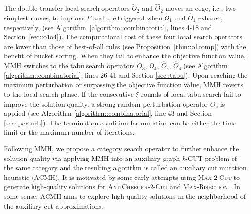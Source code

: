 \documentclass[12pt, a4paper]{article}%
\numberwithin{equation}{section}
\theoremstyle{plain}
\newcommand{\blue}{\textcolor{blue}}
\begin{document}

The double-transfer local search operators $\widetilde{O}_2$ and $\widehat{O}_2$ moves an edge, i.e., two simplest moves, to improve $F$ and are triggered when $\widetilde{O}_1$ and $\widehat{O}_1$ exhaust, respectively, (see Algorithm~\ref{algorithm::combinatorial}, lines 4-18 and Section~\ref{sec::o1o4}). The computational cost of these four local search operators are lower than those of best-of-all rules (see Proposition~\ref{thm::o1comp}) with the benefit of bucket sorting.  When they fail to enhance the objective function value, 
MMH switches to the tabu search operators $\widetilde{O}_3$, $\widetilde{O}_4$, $\widehat{O}_3$, $\widehat{O}_4$ (see Algorithm \ref{algorithm::combinatorial}, lines 26-41 and Section \ref{sec::tabu}). Upon reaching the maximum perturbation  or surpassing the objective function value, MMH reverts to the local search phase. If the consecutive $\xi$ rounds of local-tabu search fail to improve the solution quality, a strong random perturbation operator $O_5$ is applied (see Algorithm \ref{algorithm::combinatorial}, line 43 and Section \ref{sec::perturb}). The termination condition for mutation can be either the time limit or the maximum number of iterations. 


Following MMH, we propose a category search operator to further enhance the solution quality 
via applying MMH into an auxiliary graph $k$-CUT problem of the same category and the resulting algorithm is called an auxiliary cut mutation heuristic (ACMH). It is motivated by some early attempts using \textsc{Max}-$2$-\textsc{Cut} to generate high-quality solutions for \textsc{AntiCheeger}-$2$-\textsc{Cut} and  \textsc{Max}-\textsc{Bisection} \cite{shao2021continuous, burer2002rank}. 
In some sense, ACMH aims to explore high-quality solutions in the neighborhood of the auxiliary cut approximations.

\end{document}
